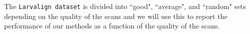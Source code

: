\documentclass{book}
\begin{document}
	The \texttt{Larvalign dataset} is divided into ``good", ``average", and ``random" sets depending on the quality of the scans and we will use this to report the performance of our methods as a function of the quality of the scans.	

\end{document}
